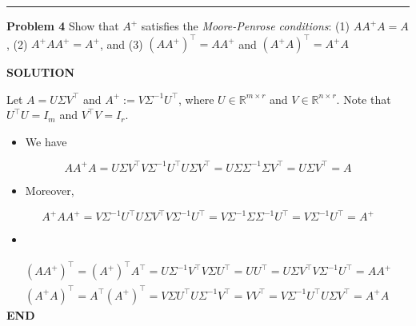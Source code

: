 \documentclass[12pt,a4paper]{article}
\def\bbR{ {\mathbb R} }
\begin{document}
\rule{\textwidth}{1pt}
\textbf{Problem 4}  Show that $A^+$ satisfies the \emph{Moore-Penrose conditions}: (1) $A A^+ A = A$, (2) $A^+ A A^+ = A^+$, and (3) $(A A^+)^\ensuremath{\top} = A A^+$ and $(A^+ A)^\ensuremath{\top} = A^+ A$

\textbf{SOLUTION}

Let $A=U\ensuremath{\Sigma} V^\ensuremath{\top}$ and $A^+ := V \ensuremath{\Sigma}^{-1} U^\ensuremath{\top}$, where $U \ensuremath{\in} \ensuremath{\bbR}^{m \ensuremath{\times} r}$ and $V \ensuremath{\in} \ensuremath{\bbR}^{n \ensuremath{\times} r}$. Note that $U^\ensuremath{\top}U = I_m$ and $V^\ensuremath{\top}V = I_r$. 

\begin{itemize}
\item[1. ] We have

\end{itemize}
\[
A A^+ A = U \ensuremath{\Sigma} V^\ensuremath{\top} V \ensuremath{\Sigma}^{-1} U^\ensuremath{\top} U \ensuremath{\Sigma} V^\ensuremath{\top} = U \ensuremath{\Sigma} \ensuremath{\Sigma}^{-1} \ensuremath{\Sigma} V^\ensuremath{\top} = U\ensuremath{\Sigma} V^\ensuremath{\top} = A
\]
\begin{itemize}
\item[2. ] Moreover,

\end{itemize}
\[
A^+ A A^+ = V \ensuremath{\Sigma}^{-1}U^\ensuremath{\top} U \ensuremath{\Sigma} V^\ensuremath{\top} V \ensuremath{\Sigma}^{-1} U^\ensuremath{\top} = V \ensuremath{\Sigma}^{-1}\ensuremath{\Sigma} \ensuremath{\Sigma}^{-1} U^\ensuremath{\top} = V \ensuremath{\Sigma}^{-1} U^\ensuremath{\top} = A^+
\]
\begin{itemize}
\item[3. ] \end{itemize}

\begin{align*}
(A A^+)^\ensuremath{\top} = (A^+)^\ensuremath{\top} A^\ensuremath{\top} = U \ensuremath{\Sigma}^{-1} V^\ensuremath{\top} V \ensuremath{\Sigma} U^\ensuremath{\top} = U U^\ensuremath{\top} = U \ensuremath{\Sigma} V^\ensuremath{\top} V \ensuremath{\Sigma}^{-1} U^\ensuremath{\top} = A A^+ \\
(A^+ A)^\ensuremath{\top} = A^\ensuremath{\top} (A^+)^\ensuremath{\top} =  V \ensuremath{\Sigma} U^\ensuremath{\top} U \ensuremath{\Sigma}^{-1} V^\ensuremath{\top} = V V^\ensuremath{\top} = V \ensuremath{\Sigma}^{-1} U^\ensuremath{\top} U \ensuremath{\Sigma} V^\ensuremath{\top}  = A^+ A
\end{align*}
\textbf{END}
\end{document}
